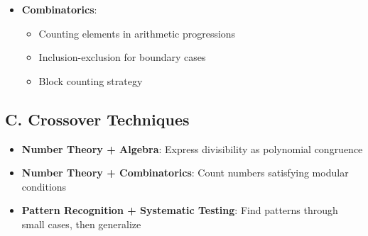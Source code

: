 \documentclass[11pt]{article}
\begin{document}
\begin{tacticalbox}
\begin{itemize}[leftmargin=*]
    \item \textbf{Combinatorics}: 
    \begin{itemize}
        \item Counting elements in arithmetic progressions
        \item Inclusion-exclusion for boundary cases
        \item Block counting strategy
    \end{itemize}
\end{itemize}

\subsection*{C. Crossover Techniques}
\begin{itemize}[leftmargin=*]
    \item \textbf{Number Theory + Algebra}: Express divisibility as polynomial congruence
    
    \item \textbf{Number Theory + Combinatorics}: Count numbers satisfying modular conditions
    
    \item \textbf{Pattern Recognition + Systematic Testing}: Find patterns through small cases, then generalize
\end{itemize}
\end{tacticalbox}
\end{document}
